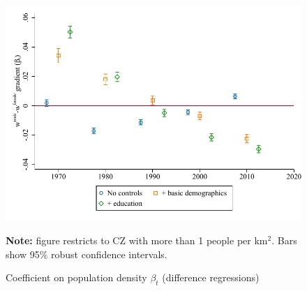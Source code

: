 \begin{figure}[!h]
\centering
\caption{Coefficient on population density $ \beta_t $ (difference regressions)}
\includegraphics[width=.6\textwidth]{../2_analysis/output/figures/difference_gradients_l_czone_density_full_time}
\par \begin{minipage}[h]{\textwidth}{\scriptsize\textbf{Note:} figure restricts to CZ with more than 1 people per km$^2$. Bars show 95\% robust confidence intervals.}\end{minipage}
\end{figure}
